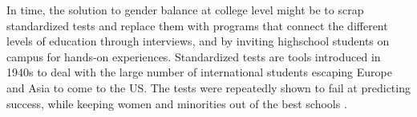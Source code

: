 \documentclass[utf8]{frontiersSCNS} %
\begin{document}




In time, the solution to gender balance at college level might be to scrap standardized tests and replace them with programs that connect the different levels of education through interviews, and by inviting highschool students on campus for hands-on experiences. Standardized tests are tools introduced in 1940s to deal with the large number of international students escaping Europe and Asia to come to the US. The tests were repeatedly shown to fail at predicting success, while keeping women and minorities out of the best schools \citep{ripin1996fighting,miller2014test}.
\end{document}
